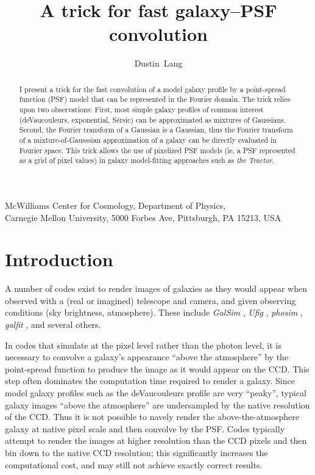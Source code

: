 \documentclass[11pt,preprint]{aastex}
\newcommand{\project}[1]{\textsl{#1}}
\begin{document}
\title{A trick for fast galaxy--PSF convolution}
\author{Dustin~Lang}
\affil%
{McWilliams Center for Cosmology,
  Department of Physics, \\ Carnegie Mellon University,
  5000 Forbes Ave, Pittsburgh, PA 15213, USA}
\date{}

\begin{abstract}
  I present a trick for the fast convolution of a model galaxy profile
  by a point-spread function (PSF) model that can be represented in
  the Fourier domain.  The trick relies upon two observations: First, most
  simple galaxy profiles of common interest (deVaucouleurs,
  exponential, S\'ersic) can be approximated as mixtures of Gaussians.
  Second, the Fourier transform of a Gaussian is a Gaussian, thus the
  Fourier transform of a mixture-of-Gausssian approximation of a
  galaxy can be directly evaluated in Fourier space.  This trick
  allows the use of pixelized PSF models (ie, a PSF represented as a
  grid of pixel values) in galaxy model-fitting approaches such as
  \project{the Tractor}.
\end{abstract}

\section{Introduction}

A number of codes exist to render images of galaxies as they would
appear when observed with a (real or imagined) telescope and camera,
and given observing conditions (sky brightness, atmosphere).  These
include \project{GalSim} \citep{galsim}, \project{Ufig} \citep{ufig},
\project{phosim} \citep{phosim}, \project{galfit} \citep{galfit}, and
several others.


In codes that simulate at the pixel level rather than the photon
level, it is necessary to convolve a galaxy's appearance ``above the
atmosphere'' by the point-spread function to produce the image as it
would appear on the CCD.  This step often dominates the computation
time required to render a galaxy.  Since model galaxy profiles such as
the deVaucouleurs profile are very ``peaky'', typical galaxy images
``above the atmosphere'' are undersampled by the native resolution of
the CCD.  Thus it is not possible to na\:vely render the
above-the-atmosphere galaxy at native pixel scale and then convolve by
the PSF.  Codes typically attempt to render the images at higher
resolution than the CCD pixels and then bin down to the native CCD
resolution; this significantly increases the computational cost, and
may still not achieve exactly correct results.
\end{document}
